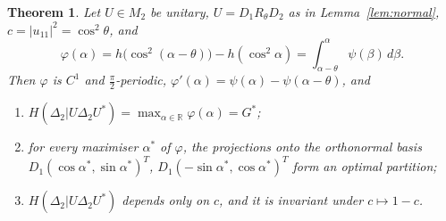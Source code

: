 \documentclass[11pt]{article}
\newcommand{\R}{\mathbb{R}}
\theoremstyle{plain}
\newtheorem{theorem}{Theorem}[section]
\theoremstyle{definition}
\theoremstyle{remark}
\begin{document}
\begin{theorem}\label{thm:n2}
Let $U\in M_2$ be unitary, $U=D_1R_\theta D_2$ as in Lemma~\ref{lem:normal}, $c=|u_{11}|^2=\cos^2\theta$, and
\[
  \varphi(\alpha)=h\bigl(\cos^2(\alpha-\theta)\bigr)-h(\cos^2\alpha)=\int_{\alpha-\theta}^{\alpha}\psi(\beta)\,d\beta .
\]
Then $\varphi$ is $C^1$ and $\frac\pi2$-periodic, $\varphi'(\alpha)=\psi(\alpha)-\psi(\alpha-\theta)$, and
\begin{enumerate}
\item[(a)] $H(\Delta_2|U\Delta_2U^*)=\max_{\alpha\in\R}\varphi(\alpha)=G^*$;
\item[(b)] for every maximiser $\alpha^*$ of $\varphi$, the projections onto the orthonormal basis $D_1(\cos\alpha^*,\sin\alpha^*)^T$,
$D_1(-\sin\alpha^*,\cos\alpha^*)^T$ form an optimal partition;
\item[(c)] $H(\Delta_2|U\Delta_2U^*)$ depends only on $c$, and it is invariant under $c\mapsto1-c$.
\end{enumerate}
\end{theorem}
\end{document}
